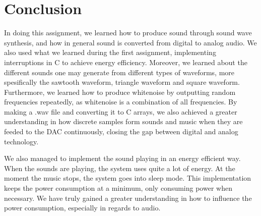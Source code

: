 \section{Conclusion}

In doing this assignment, we learned how to produce sound through sound wave synthesis, and how in general sound is converted from digital to analog audio.
We also used what we learned during the first assignment, implementing interruptions in C to achieve energy efficiency.
Moreover, we learned about the different sounds one may generate from different types of waveforms, more spesifically the sawtooth waveform, triangle waveform and square waveform.
Furthermore, we learned how to produce whitenoise by outputting random frequencies repeatedly, as whitenoise is a combination of all frequencies.
By making a .wav file and converting it to C arrays, we also achieved a greater understanding in how discrete samples form sounds and music when they are feeded to the DAC continuously, closing the gap between digital and analog technology.

We also managed to implement the sound playing in an energy efficient way. When the sounds are playing, the system uses quite a lot of energy.
At the moment the music stops, the system goes into sleep mode.
This implementation keeps the power consumption at a minimum, only consuming power when necessary.
We have truly gained a greater understanding in how to influence the power consumption, especially in regards to audio.